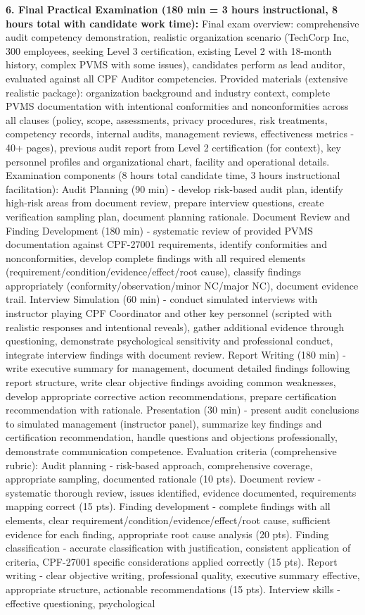 \documentclass[11pt,a4paper]{article}
\begin{document}
\textbf{6. Final Practical Examination (180 min = 3 hours instructional, 8 hours total with candidate work time):} Final exam overview: comprehensive audit competency demonstration, realistic organization scenario (TechCorp Inc, 300 employees, seeking Level 3 certification, existing Level 2 with 18-month history, complex PVMS with some issues), candidates perform as lead auditor, evaluated against all CPF Auditor competencies. Provided materials (extensive realistic package): organization background and industry context, complete PVMS documentation with intentional conformities and nonconformities across all clauses (policy, scope, assessments, privacy procedures, risk treatments, competency records, internal audits, management reviews, effectiveness metrics - 40+ pages), previous audit report from Level 2 certification (for context), key personnel profiles and organizational chart, facility and operational details. Examination components (8 hours total candidate time, 3 hours instructional facilitation): Audit Planning (90 min) - develop risk-based audit plan, identify high-risk areas from document review, prepare interview questions, create verification sampling plan, document planning rationale. Document Review and Finding Development (180 min) - systematic review of provided PVMS documentation against CPF-27001 requirements, identify conformities and nonconformities, develop complete findings with all required elements (requirement/condition/evidence/effect/root cause), classify findings appropriately (conformity/observation/minor NC/major NC), document evidence trail. Interview Simulation (60 min) - conduct simulated interviews with instructor playing CPF Coordinator and other key personnel (scripted with realistic responses and intentional reveals), gather additional evidence through questioning, demonstrate psychological sensitivity and professional conduct, integrate interview findings with document review. Report Writing (180 min) - write executive summary for management, document detailed findings following report structure, write clear objective findings avoiding common weaknesses, develop appropriate corrective action recommendations, prepare certification recommendation with rationale. Presentation (30 min) - present audit conclusions to simulated management (instructor panel), summarize key findings and certification recommendation, handle questions and objections professionally, demonstrate communication competence. Evaluation criteria (comprehensive rubric): Audit planning - risk-based approach, comprehensive coverage, appropriate sampling, documented rationale (10 pts). Document review - systematic thorough review, issues identified, evidence documented, requirements mapping correct (15 pts). Finding development - complete findings with all elements, clear requirement/condition/evidence/effect/root cause, sufficient evidence for each finding, appropriate root cause analysis (20 pts). Finding classification - accurate classification with justification, consistent application of criteria, CPF-27001 specific considerations applied correctly (15 pts). Report writing - clear objective writing, professional quality, executive summary effective, appropriate structure, actionable recommendations (15 pts). Interview skills - effective questioning, psychological 
\end{document}

